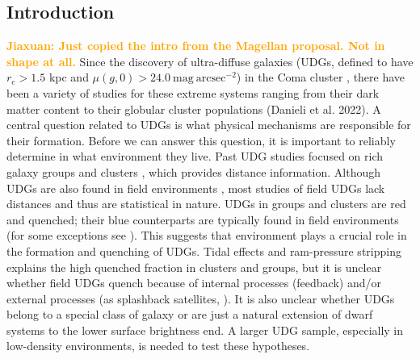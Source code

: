 \documentclass[twocolumn,astrosymb,twocolappendix]{aastex631}
\newcommand{\jiaxuan}[1]{\textcolor{orange}{\textbf{Jiaxuan: #1}}}
\begin{document}
\begin{CJK*}{UTF8}{gbsn}

\begin{abstract}

\end{abstract}



\section{Introduction} \label{sec:intro}

\jiaxuan{Just copied the intro from the Magellan proposal. Not in shape at all.}
Since the discovery of ultra-diffuse galaxies (UDGs, defined to have $r_e > 1.5$ kpc and $\mu(g,0)>24.0\ \mathrm{mag\ arcsec^{-2}}$) in the Coma cluster \citep{vanDokkum2015}, there have been a variety of studies for these extreme systems ranging from their dark matter content \citep{vanDokkum2018,vanDokkum2019} to their globular cluster populations (Danieli et al. 2022). A central question related to UDGs is what physical mechanisms are responsible for their formation. Before we can answer this question, it is important to reliably determine in what environment they live.
Past UDG studies focused on rich galaxy groups and clusters \citep[e.g.,][]{Yagi2016,Zaritsky2019}, which provides distance information. Although UDGs are also found in field environments \citep{Prole2019,Tanoglidis2021,Kadowaki2021}, most studies of field UDGs lack distances and thus are statistical in nature. UDGs in groups and clusters are red and quenched; their blue counterparts are typically found in field environments (for some exceptions see \citealt{Roman2019,Prole2019}). This suggests that environment plays a crucial role in the formation and quenching of UDGs. Tidal effects and ram-pressure stripping explains the high quenched fraction in clusters and groups, but it is unclear whether field UDGs quench because of internal processes (feedback) and/or external processes (as splashback satellites, \citealt{Benavides2021}). It is also unclear whether UDGs belong to a special class of galaxy or are just a natural extension of dwarf systems to the lower surface brightness end. A larger UDG sample, especially in low-density environments, is needed to test these hypotheses.


\end{CJK*}
\end{document}
